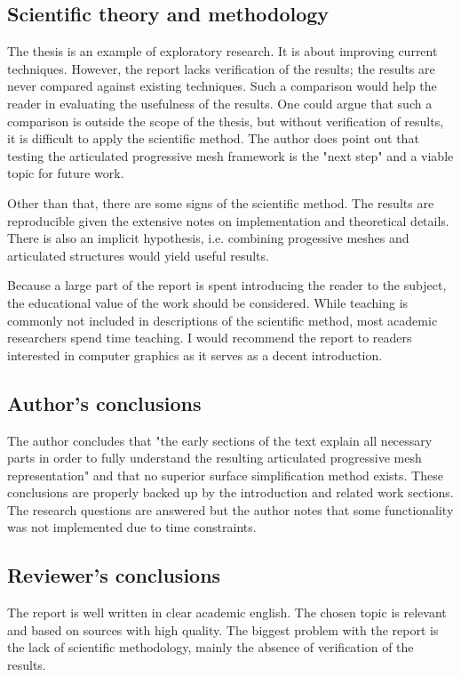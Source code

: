 \documentclass{article}
\begin{document}
\subsection{Scientific theory and methodology}

The thesis is an example of exploratory research. It is about improving current
techniques. However, the report lacks verification of the results; the results
are never compared against existing techniques. Such a comparison would help the
reader in evaluating the usefulness of the results. One could argue that such a
comparison is outside the scope of the thesis, but without verification of
results, it is difficult to apply the scientific method. The author does point
out that testing the articulated progressive mesh framework is the "next step"
and a viable topic for future work.

Other than that, there are some signs of the scientific method. The results are
reproducible given the extensive notes on implementation and theoretical
details. There is also an implicit hypothesis, i.e. combining progessive meshes
and articulated structures would yield useful results.

Because a large part of the report is spent introducing the reader to the
subject, the educational value of the work should be considered. While teaching
is commonly not included in descriptions of the scientific method, most academic
researchers spend time teaching. I would recommend the report to readers
interested in computer graphics as it serves as a decent introduction.

\subsection{Author's conclusions}

The author concludes that "the early sections of the text explain all necessary
parts in order to fully understand the resulting articulated progressive mesh
representation" and that no superior surface simplification method exists. These
conclusions are properly backed up by the introduction and related work
sections. The research questions are answered but the author notes that some
functionality was not implemented due to time constraints.

\subsection{Reviewer's conclusions}

The report is well written in clear academic english. The chosen topic is
relevant and based on sources with high quality. The biggest problem with the
report is the lack of scientific methodology, mainly the absence of verification
of the results.
\end{document}
